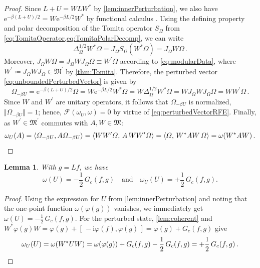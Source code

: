 \documentclass[a4paper, twoside, 11pt, reqno]{amsart}
\theoremstyle{definition}
\theoremstyle{plain}
\newtheorem{lemma}[definition]{Lemma}
\renewcommand{\Delta}{\varDelta}
\renewcommand{\Omega}{\varOmega}
\newcommand{\MF}{\mathcal{F}}
\newcommand{\MFM}{\mathfrak{M}}
\newcommand{\ii}{\mathrm{i}}
\newcommand{\ee}{\mathrm{e}}
\newcommand{\comm}[1]{#1^{\prime}}
\newcommand{\1}{\mathbf{1}}
\newcommand{\norm}[2][]{#1\Vert{#2}#1\Vert}
\newcommand{\braket}[2][]{#1\langle{#2}#1\rangle}
\newcommand{\ce}{\coloneqq}
\newcommand{\ph}{\varphi}
\newcommand{\Gc}{G_{c}}
\begin{document}
\begin{proof}
    Since $L + U = W L W^\ast$ by \cref{lem:innerPerturbation}, we also have $\ee^{- \beta (L + U) / 2} = W \ee^{- \beta L / 2} W^\ast$ by functional calculus \cite[Prop. 3.60]{Moretti19}. Using the defining property and polar decomposition of the Tomita operator $S_\Omega$ from \cref{eq:TomitaOperator,eq:TomitaPolarDecomp}, we can write
    \begin{equation*}
        \Delta_\Omega^{1/2} W^\ast \Omega = J_\Omega S_\Omega (W^\ast \Omega) = J_\Omega W \Omega \, .
    \end{equation*}
    Moreover, $J_\Omega W \Omega = J_\Omega W J_\Omega \Omega \equiv W^\prime \Omega$ according to \cref{eq:modularData}, where $W^\prime \ce J_\Omega W J_\Omega \in \comm{\MFM}$ by \cref{thm:Tomita}. Therefore, the perturbed vector \eqref{eq:unboundedPerturbedVector} is given by
    \begin{equation*}
        \Omega_{- \beta U} = \ee^{- \beta (L + U) / 2} \Omega = W \ee^{- \beta L / 2} W^\ast \Omega = W \Delta_\Omega^{1/2} W^\ast \Omega = W J_\Omega W J_\Omega \Omega = W W^\prime \Omega \, .
    \end{equation*}
    Since $W$ and $W^\prime$ are unitary operators, it follows that $\Omega_{- \beta U}$ is normalized, $\norm{\Omega_{- \beta U}} = 1$; hence, $\MF (\omega_U, \omega) = 0$ by virtue of \cref{eq:perturbedVectorRFE}. Finally, as $W^\prime \in \comm{\MFM}$ commutes with $A,W \in \MFM$:
    \begin{equation*}
        \omega_U(A) = \braket{\Omega_{- \beta U}, A \Omega_{- \beta U}} = \braket{W W^\prime \Omega, \, A \, W W^\prime \Omega} = \braket{\Omega, \, W^\ast A W \, \Omega} = \omega(W^\ast A W) \, . \qedhere
    \end{equation*}
\end{proof}
    
\begin{lemma}\label{lem:expectationValues}
    With $g = Lf$, we have
    \begin{equation*}
      \omega(U) = - \frac{1}{2} \, \Gc(f,g) \quad \text{and} \quad \omega_U(U) = + \frac{1}{2} \, \Gc(f,g).
    \end{equation*}
\end{lemma}

\begin{proof}
    Using the expression for $U$ from \cref{lem:innerPerturbation} and noting that the one-point function $\omega(\ph(g))$ vanishes, we immediately get $\omega(U) = - \frac{1}{2} \, \Gc(f,g)$. For the perturbed state, \cref{lem:coherent} and
    $W^\ast \ph(g) W = \ph(g) + [\, - \ii \ph(f), \ph(g) \,] = \ph(g) + \Gc(f,g)$ give
    \begin{equation*}
        \omega_U(U) = \omega(W^\ast U W) = \omega(\ph(g)) + \Gc(f,g) - \frac{1}{2} \, \Gc(f,g) = + \frac{1}{2} \, \Gc(f,g) \, . \qedhere
    \end{equation*}
\end{proof}
\end{document}
